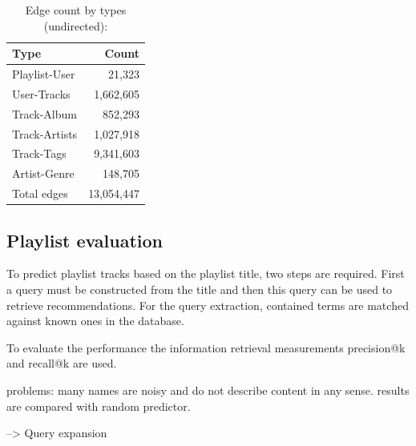 \documentclass[sigconf]{acmart}
\begin{document}
\begin{table}[H]
	\caption{Edge count by types (undirected):}
	\label{table:edge_count}
	\begin{tabular}{lr}
		\midrule 
		\textbf{Type} & \textbf{Count} \\ 
		\midrule 
		Playlist-User   & 21,323  \\
		User-Tracks     & 1,662,605     \\
		Track-Album		& 852,293 \\
		Track-Artists   & 1,027,918 \\
		Track-Tags   	& 9,341,603 \\
		Artist-Genre	& 148,705  \\
		\midrule 
		Total edges 	& 13,054,447\\
		\bottomrule
	\end{tabular}
\end{table}

\subsection{Playlist evaluation}
\label{subsec:playlist_eval}
To predict playlist tracks based on the playlist title, two steps are required. First a query must be constructed from the title and then this query can be used to retrieve recommendations. For the query extraction, contained terms are matched against known ones in the database. 
 
 To evaluate the performance the information retrieval measurements precision@k and recall@k are used.

problems: many names are noisy and do not describe content in any sense. results are compared with random predictor.


--> Query expansion






\end{document}

